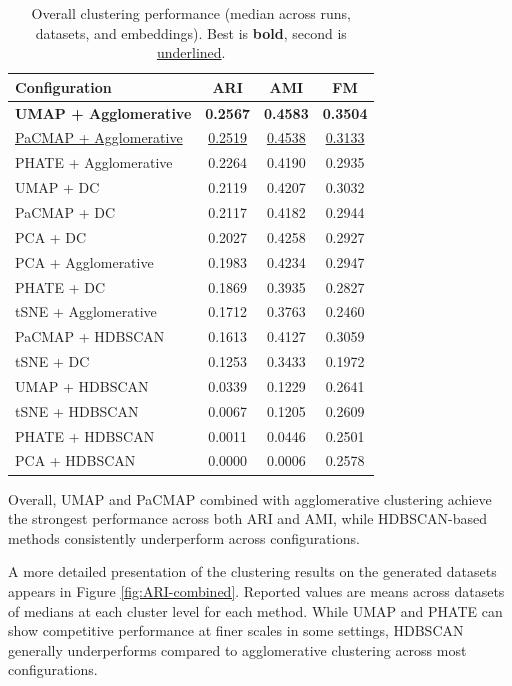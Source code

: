 \begin{table}[t]
    \centering
    \caption{Overall clustering performance (median across runs, datasets, and embeddings). Best is \textbf{bold}, second is \underline{underlined}.}
    \begin{tabular}{lccc}
    \toprule
    Configuration & ARI & AMI & FM \\
    \midrule
    \textbf{UMAP + Agglomerative} & \textbf{0.2567} & \textbf{0.4583} & \textbf{0.3504} \\
    \underline{PaCMAP + Agglomerative} & \underline{0.2519} & \underline{0.4538} & \underline{0.3133} \\
    PHATE + Agglomerative & 0.2264 & 0.4190 & 0.2935 \\
    UMAP + DC & 0.2119 & 0.4207 & 0.3032 \\
    PaCMAP + DC & 0.2117 & 0.4182 & 0.2944 \\
    PCA + DC & 0.2027 & 0.4258 & 0.2927 \\
    PCA + Agglomerative & 0.1983 & 0.4234 & 0.2947 \\
    PHATE + DC & 0.1869 & 0.3935 & 0.2827 \\
    tSNE + Agglomerative & 0.1712 & 0.3763 & 0.2460 \\
    PaCMAP + HDBSCAN & 0.1613 & 0.4127 & 0.3059 \\
    tSNE + DC & 0.1253 & 0.3433 & 0.1972 \\
    UMAP + HDBSCAN & 0.0339 & 0.1229 & 0.2641 \\
    tSNE + HDBSCAN & 0.0067 & 0.1205 & 0.2609 \\
    PHATE + HDBSCAN & 0.0011 & 0.0446 & 0.2501 \\
    PCA + HDBSCAN & 0.0000 & 0.0006 & 0.2578 \\
    \bottomrule
    \end{tabular}
    \end{table}
Overall, UMAP and PaCMAP combined with agglomerative clustering achieve the strongest performance across both ARI and AMI, while HDBSCAN-based methods consistently underperform across configurations.



A more detailed presentation of the clustering results on the generated datasets appears in Figure \ref{fig:ARI-combined}. Reported values are means across datasets of medians at each cluster level for each method. While UMAP and PHATE can show competitive performance at finer scales in some settings, HDBSCAN generally underperforms compared to agglomerative clustering across most configurations.

